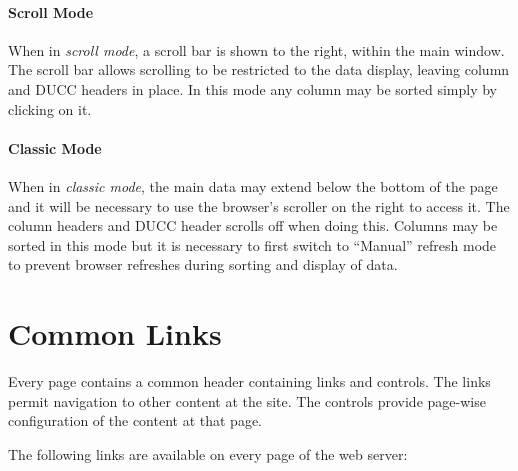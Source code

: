     \paragraph{Scroll Mode}  When in {\em scroll mode}, a scroll bar is shown to the right, within
    the main window.  The scroll bar allows scrolling to be restricted to the data
    display, leaving column and DUCC headers in place.  In this mode any column may be sorted
    simply by clicking on it.

    \paragraph{Classic Mode}  When in {\em classic mode}, the main data may extend below the 
    bottom of the page and it will be necessary to use the browser's scroller on the right
    to access it.  The column headers and DUCC header scrolls off when doing this.  Columns
    may be sorted in this mode but it is necessary to first switch to ``Manual'' refresh mode to
    prevent browser refreshes during sorting and display of data. 

\ifpdf
\else
{}
\fi
    \section{Common Links}

        Every page contains a common header containing links and controls. The links permit navigation
        to other content at the site. The controls provide page-wise configuration of the content at
        that page.

        The following links are available on every page of the web server: 

